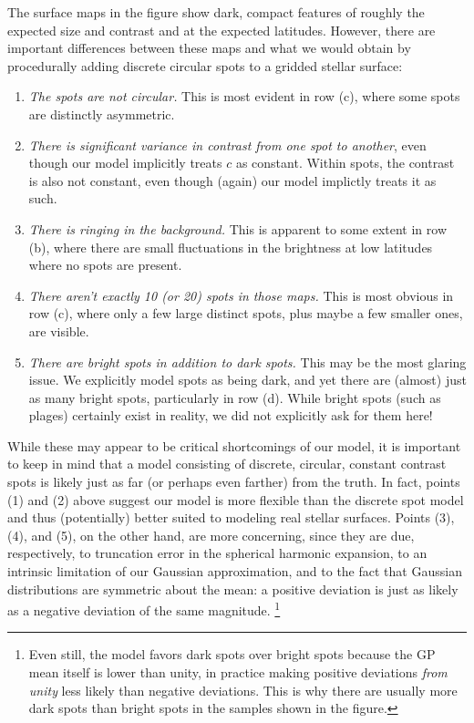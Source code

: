 \documentclass[modern,linenumbers]{aastex62}
\begin{document}
The surface maps in the figure show dark, compact features of roughly the expected
size and contrast and at the expected latitudes. However, there are important
differences between these maps and what we would obtain by procedurally adding discrete
circular spots to a gridded stellar surface:
%
\begin{enumerate}
    \item \emph{The spots are not circular.} This is most evident in row (c),
          where some spots are distinctly asymmetric.
    \item \emph{There is significant variance in contrast from one spot to another},
          even though our model
          implicitly treats $c$ as constant. Within spots, the contrast is also
          not constant, even though (again) our model implictly treats it as such.
    \item \emph{There is ringing in the background.} This is apparent to some extent in
          row (b), where there are small fluctuations in the brightness at low
          latitudes where no spots are present.
    \item \emph{There aren't exactly 10 (or 20) spots in those maps.} This is
          most obvious in row (c), where only a few large distinct spots,
          plus maybe a few smaller ones, are visible.
    \item \emph{There are bright spots in addition to dark spots.} This may be
          the most glaring issue. We explicitly model spots as being dark, and yet
          there are (almost) just as many bright spots, particularly in row (d).
          While bright spots (such as plages) certainly exist in reality, we did not
          explicitly ask for them here!
\end{enumerate}
%
While these may appear to be critical shortcomings of our model, it is
important to keep in mind that a model consisting of discrete, circular, constant
contrast spots is likely just as far (or perhaps even farther) from the truth. In fact,
points (1) and (2) above suggest our model is more flexible than the discrete
spot model and thus (potentially) better suited to modeling real stellar surfaces.
Points (3), (4), and (5), on the other hand, are more concerning, since they are due,
respectively, to truncation error in the spherical harmonic expansion,
to an intrinsic limitation of our Gaussian approximation,
and to the fact that Gaussian distributions are symmetric about the mean: a positive
deviation is just as likely as a negative deviation of the same magnitude.%
\footnote{
    Even still, the model favors dark spots over bright spots because the GP mean
    itself is lower than unity, in practice making
    positive deviations \emph{from unity} less likely than negative
    deviations. This is why there are usually more dark spots than bright spots in
    the samples shown in the figure.
}
\end{document}
